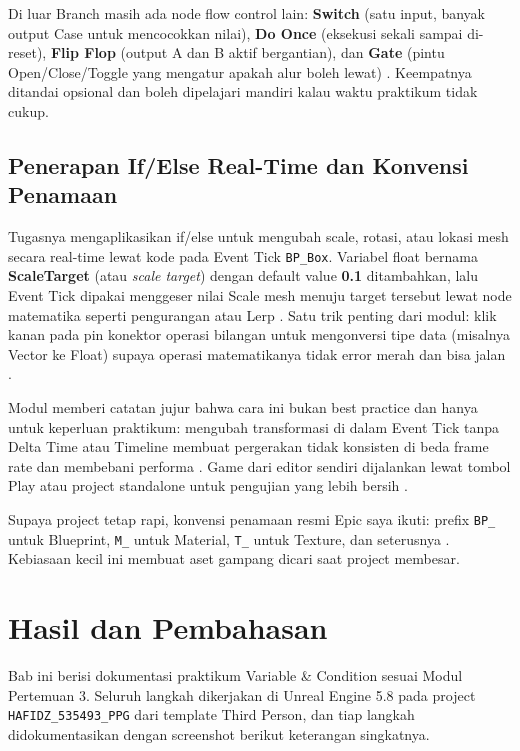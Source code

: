 \documentclass[a4paper,oneside,12pt]{report}
\newcommand{\tocboldsection}[1]{%
  \protect\renewcommand{\protect\cftchapfont}{\protect\bfseries}%
  #1%
  \protect\renewcommand{\protect\cftchapfont}{}%
}
\begin{document}
Di luar Branch masih ada node flow control lain: \textbf{Switch} (satu input, banyak output Case untuk mencocokkan nilai), \textbf{Do Once} (eksekusi sekali sampai di-reset), \textbf{Flip Flop} (output A dan B aktif bergantian), dan \textbf{Gate} (pintu Open/Close/Toggle yang mengatur apakah alur boleh lewat) \cite{modul3,epic-flow}. Keempatnya ditandai opsional dan boleh dipelajari mandiri kalau waktu praktikum tidak cukup.

\section{Penerapan If/Else Real-Time dan Konvensi Penamaan}
Tugasnya mengaplikasikan if/else untuk mengubah scale, rotasi, atau lokasi mesh secara real-time lewat kode pada Event Tick \texttt{BP\_Box}. Variabel float bernama \textbf{ScaleTarget} (atau \textit{scale target}) dengan default value \textbf{0.1} ditambahkan, lalu Event Tick dipakai menggeser nilai Scale mesh menuju target tersebut lewat node matematika seperti pengurangan atau Lerp \cite{modul3}. Satu trik penting dari modul: klik kanan pada pin konektor operasi bilangan untuk mengonversi tipe data (misalnya Vector ke Float) supaya operasi matematikanya tidak error merah dan bisa jalan \cite{modul3}.

Modul memberi catatan jujur bahwa cara ini bukan best practice dan hanya untuk keperluan praktikum: mengubah transformasi di dalam Event Tick tanpa Delta Time atau Timeline membuat pergerakan tidak konsisten di beda frame rate dan membebani performa \cite{modul3}. Game dari editor sendiri dijalankan lewat tombol Play atau project standalone untuk pengujian yang lebih bersih \cite{epic-running}.

Supaya project tetap rapi, konvensi penamaan resmi Epic saya ikuti: prefix \texttt{BP\_} untuk Blueprint, \texttt{M\_} untuk Material, \texttt{T\_} untuk Texture, dan seterusnya \cite{epic-naming}. Kebiasaan kecil ini membuat aset gampang dicari saat project membesar.

\clearpage

\chapter[\tocboldsection{Hasil dan Pembahasan}]{Hasil dan Pembahasan}

Bab ini berisi dokumentasi praktikum Variable \& Condition sesuai Modul Pertemuan 3. Seluruh langkah dikerjakan di Unreal Engine 5.8 pada project \texttt{HAFIDZ\_535493\_PPG} dari template Third Person, dan tiap langkah didokumentasikan dengan screenshot berikut keterangan singkatnya.
\end{document}
